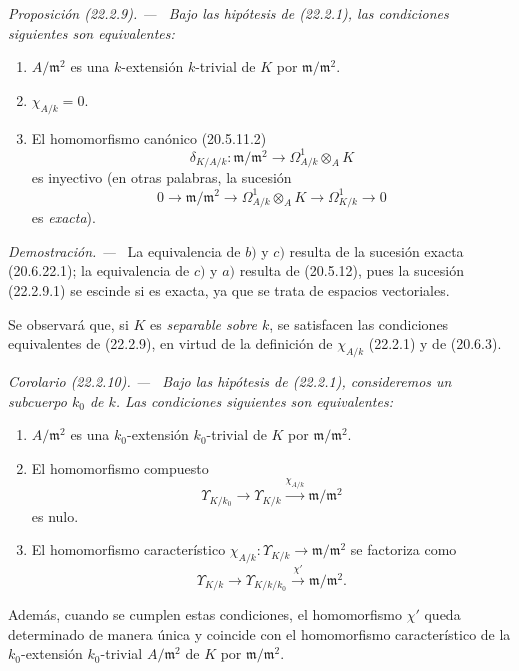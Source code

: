 \documentclass[10pt,oneside]{book}
\makeatletter
\newcommand{\setmanualcurrentlabel}[1]{\def\@currentlabel{#1}}
\newenvironment{proposition}[1][]{%
  \setmanualcurrentlabel{#1}\par\medskip\noindent\itshape Proposición (#1). ---\ }{\par}
\newenvironment{corollary}[1][]{%
  \setmanualcurrentlabel{#1}\par\medskip\noindent\itshape Corolario (#1). ---\ }{\par}
\newenvironment{proof}{%
  \par\medskip\noindent\textit{Demostración. ---\ }}{\par}
\makeatother
\begin{document}
\begin{proposition}[22.2.9]
\label{0.22.2.9-es}
Bajo las hipótesis de \textup{(22.2.1)}, las condiciones siguientes son equivalentes:
\begin{enumerate}
  \item[\textup{a)}] $A/\mathfrak m^2$ es una $k$-extensión $k$-trivial de $K$ por
  $\mathfrak m/\mathfrak m^2$.
  \item[\textup{b)}] $\chi_{A/k}=0$.
  \item[\textup{c)}] El homomorfismo canónico \textup{(20.5.11.2)}
  \[
    \delta_{K/A/k}:\mathfrak m/\mathfrak m^2
    \longrightarrow\Omega^1_{A/k}\otimes_AK
  \]
  es inyectivo \textup{(en otras palabras, la sucesión}
  \begin{equation}
  \tag{22.2.9.1}
  \label{0.22.2.9.1-es}
    0\longrightarrow\mathfrak m/\mathfrak m^2
    \longrightarrow\Omega^1_{A/k}\otimes_AK
    \longrightarrow\Omega^1_{K/k}\longrightarrow0
  \end{equation}
  \textup{es \emph{exacta})}.
\end{enumerate}
\end{proposition}

\begin{proof}
La equivalencia de $b)$ y $c)$ resulta de la sucesión exacta (20.6.22.1); la
equivalencia de $c)$ y $a)$ resulta de (20.5.12), pues la sucesión (22.2.9.1) se
escinde si es exacta, ya que se trata de espacios vectoriales.

Se observará que, si $K$ es \emph{separable sobre $k$}, se satisfacen las
condiciones equivalentes de (22.2.9), en virtud de la definición de
$\chi_{A/k}$ (22.2.1) y de (20.6.3).
\end{proof}

\begin{corollary}[22.2.10]
\label{0.22.2.10-es}
Bajo las hipótesis de \textup{(22.2.1)}, consideremos un subcuerpo $k_0$ de $k$. Las
condiciones siguientes son equivalentes:
\begin{enumerate}
  \item[\textup{a)}] $A/\mathfrak m^2$ es una $k_0$-extensión $k_0$-trivial de $K$
  por $\mathfrak m/\mathfrak m^2$.
  \item[\textup{b)}] El homomorfismo compuesto
  \[
    \Upsilon_{K/k_0}\longrightarrow\Upsilon_{K/k}
    \xrightarrow{\chi_{A/k}}\mathfrak m/\mathfrak m^2
  \]
  es nulo.
  \item[\textup{c)}] El homomorfismo característico
  $\chi_{A/k}:\Upsilon_{K/k}\to\mathfrak m/\mathfrak m^2$ se factoriza como
  \[
    \Upsilon_{K/k}\longrightarrow\Upsilon_{K/k/k_0}
    \xrightarrow{\chi'}\mathfrak m/\mathfrak m^2.
  \]
\end{enumerate}
Además, cuando se cumplen estas condiciones, el homomorfismo $\chi'$ queda
determinado de manera única y coincide con el homomorfismo característico de
la $k_0$-extensión $k_0$-trivial $A/\mathfrak m^2$ de $K$ por
$\mathfrak m/\mathfrak m^2$.
\end{corollary}
\end{document}
